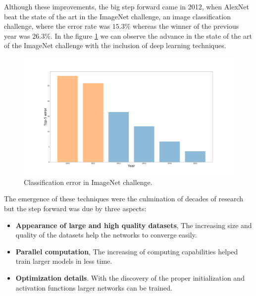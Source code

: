 Although these improvements, the big step forward came in 2012, when AlexNet \cite{alexnet} beat the state of the art in the ImageNet challenge, an image classification challenge, where the error rate was $15.3 \%$ whereas the winner of the previous year was $26.3 \%$. In the figure \ref{intro2} we can observe the advance in the state of the art of the ImageNet challenge with the inclusion of deep learning techniques.




\begin{figure}[H]
\centering         
\includegraphics[width=0.7\linewidth]{intro/iamgeWihtou.png}
\caption{Classification error in ImageNet challenge.} \label{intro2}
\end{figure}



The emergence of these techniques were the culmination of decades of research but the step forward was due by three aspects:

\begin{itemize}

\item \textbf{Appearance of large and high quality datasets}, The increasing size and quality of the datasets help the networks to converge easily.

\item \textbf{Parallel computation}, The increasing of computing capabilities helped train larger models in less time.

\item \textbf{Optimization details}. With the discovery of the proper initialization and activation functions larger networks can be trained.


\end{itemize}












